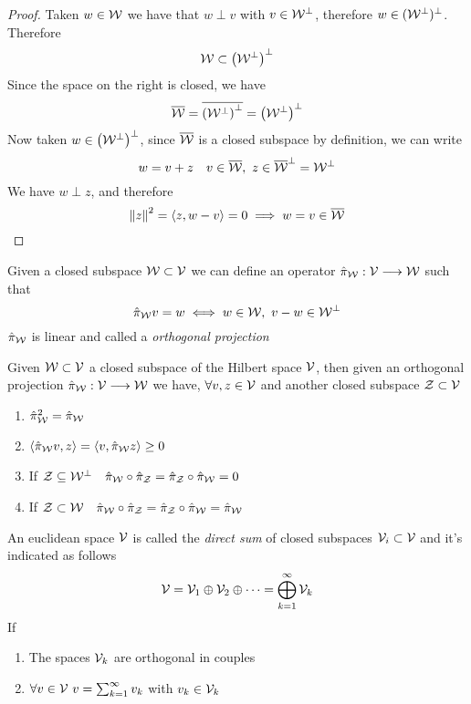 \documentclass[../complete.tex]{subfiles}
\begin{document}
\begin{proof}
	Taken $w\in\mathcal{W}$ we have that $w\perp v$ with $v\in\mathcal{W}^\perp$, therefore $w\in(\mathcal{W}^\perp)^\perp$. Therefore
	\begin{equation*}
		\mathcal{W}\subset\left( \mathcal{W}^\perp \right)^\perp
	\end{equation*}
	Since the space on the right is closed, we have
	\begin{equation*}
		\overline{\mathcal{W}}=\overline{\left( \mathcal{W}^\perp \right)^\perp}=\left( \mathcal{W}^\perp \right)^\perp
	\end{equation*}
	Now taken $w\in\left( \mathcal{W}^\perp \right)^\perp$, since $\overline{\mathcal{W}}$ is a closed subspace by definition, we can write
	\begin{equation*}
		w=v+z\quad v\in\overline{\mathcal{W}},\ z\in\overline{\mathcal{W}}^\perp=\mathcal{W}^\perp
	\end{equation*}
	We have $w\perp z$, and therefore
	\begin{equation*}
		\norm{z}^2=\langle z, w-v \rangle=0\implies w=v\in\overline{\mathcal{W}}
	\end{equation*}
\end{proof}
\begin{dfn}
	Given a closed subspace $\mathcal{W}\subset\mathcal{V}$ we can define an operator $\hat{\pi}_{\mathcal{W}}:\mathcal{V}\overset{}{\longrightarrow}\mathcal{W}$ such that
	\begin{equation}
		\hat{\pi}_{\mathcal{W}} v=w\iff w\in\mathcal{W},\ v-w\in\mathcal{W}^\perp
		\label{eq:orthprojection}
	\end{equation}
	$\hat{\pi}_{\mathcal{W}}$ is linear and called a \textit{orthogonal projection}
\end{dfn}
\begin{thm}
	Given $\mathcal{W}\subset\mathcal{V}$ a closed subspace of the Hilbert space $\mathcal{V}$, then given an orthogonal projection $\hat{\pi}_{\mathcal{W}}:\mathcal{V}\overset{}{\longrightarrow}\mathcal{W}$ we have, $\forall v,z\in\mathcal{V}$ and another closed subspace $\mathcal{Z}\subset\mathcal{V}$
	\begin{enumerate}
	\item $\hat{\pi}_{\mathcal{W}}^2=\hat{\pi}_{\mathcal{W}}$
	\item $\langle \hat{\pi}_{\mathcal{W}} v, z \rangle=\langle v, \hat{\pi}_{\mathcal{W}} z \rangle\ge0$
	\item If $\mathcal{Z}\subseteq\mathcal{W}^\perp\quad\hat{\pi}_{\mathcal{W}}\circ\hat{\pi}_{\mathcal{Z}}=\hat{\pi}_{\mathcal{Z}}\circ\hat{\pi}_{\mathcal{W}}=0$
	\item If $\mathcal{Z}\subset\mathcal{W}\quad\hat{\pi}_{\mathcal{W}}\circ\hat{\pi}_{\mathcal{Z}}=\hat{\pi}_{\mathcal{Z}}\circ\hat{\pi}_{\mathcal{W}}=\hat{\pi}_{\mathcal{W}}$
	\end{enumerate}
\end{thm}
\begin{dfn}
	An euclidean space $\mathcal{V}$ is called the \textit{direct sum} of closed subspaces $\mathcal{V}_i\subset\mathcal{V}$ and it's indicated as follows
	\begin{equation}
		\mathcal{V}=\mathcal{V}_1\oplus\mathcal{V}_2\oplus\cdots=\bigoplus_{k=1}^\infty\mathcal{V}_k
		\label{eq:directsum}
	\end{equation}
	If
	\begin{enumerate}
	\item The spaces $\mathcal{V}_k$ are orthogonal in couples
	\item $\forall v\in\mathcal{V}\ v=\sum_{k=1}^\infty v_k$ with $v_k\in\mathcal{V}_k$
	\end{enumerate}
\end{dfn}
\end{document}
